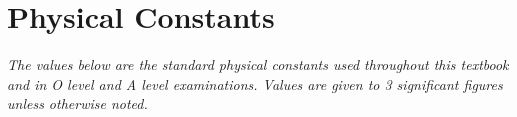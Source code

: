 
\chapter{Physical Constants}

\begin{center}
{\small\itshape
The values below are the standard physical constants used
throughout this textbook and in O level and A level examinations.
Values are given to 3 significant figures unless otherwise noted.
}
\end{center}

\vspace{0.5cm}

